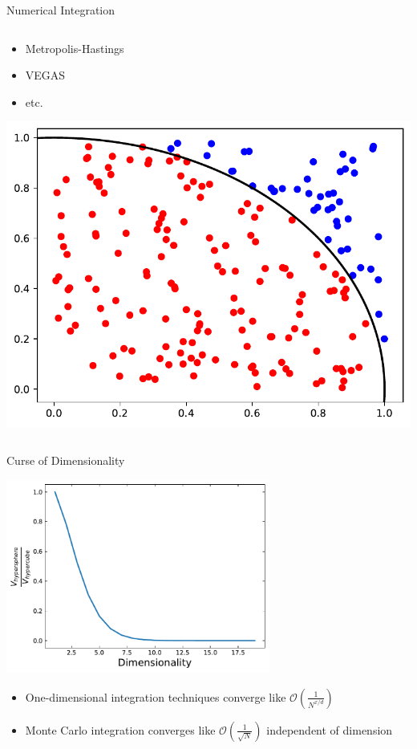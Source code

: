 \documentclass{beamer}
\begin{document}
\begin{frame}{Numerical Integration}
\begin{columns}
\begin{column}{5cm}
\begin{itemize}
            \item Metropolis-Hastings
            \item VEGAS
            \item etc.
        \end{itemize}
        \includegraphics[width=\textwidth]{figs/circle.pdf}
        \end{column}
    \end{columns}
\end{frame}


\begin{frame}{Curse of Dimensionality}

\begin{center}
\includegraphics[width=0.65\textwidth]{figs/dimensionality.pdf}
\end{center}


\small
\begin{itemize}
    \item One-dimensional integration techniques converge like $\mathcal{O}\left(\frac{1}{N^{x/d}}\right)$
    \item<2-> Monte Carlo integration converges like $\mathcal{O}\left(\frac{1}{\sqrt{N}}\right)$ independent of dimension
\end{itemize}
    
\end{frame}
\end{document}
